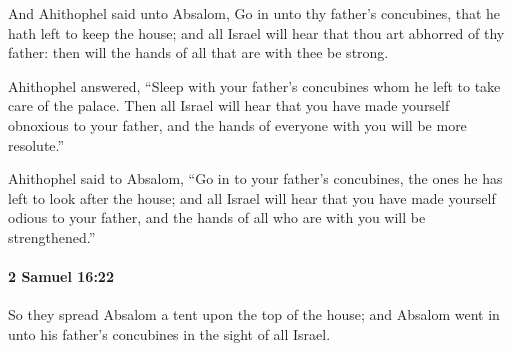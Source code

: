 			\begin{versebox}
					\item[BHS] 
					\item[ASV] And Ahithophel said unto Absalom, Go in unto thy father's concubines, that he hath left to keep the house; and all Israel will hear that thou art abhorred of thy father: then will the hands of all that are with thee be strong.
					\item[NIV] Ahithophel answered, “Sleep with your father’s concubines whom he left to take care of the palace. Then all Israel will hear that you have made yourself obnoxious to your father, and the hands of everyone with you will be more resolute.”
					\item[NRSV] Ahithophel said to Absalom, “Go in to your father’s concubines, the ones he has left to look after the house; and all Israel will hear that you have made yourself odious to your father, and the hands of all who are with you will be strengthened.”
			\end{versebox}

		\paragraph{2 Samuel 16:22} %
			\label{2SAMUEL-16-22}

			So they spread Absalom a tent upon the top of the house; and Absalom went in unto his father’s concubines in the sight of all Israel.

